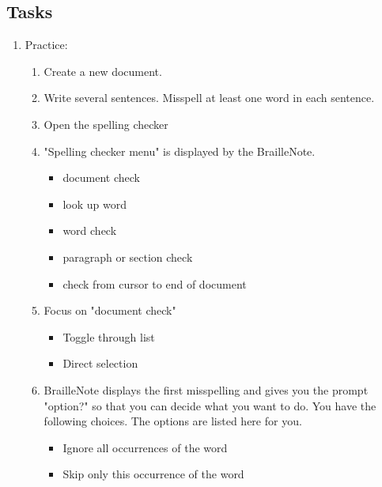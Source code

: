 \documentclass[10pt,letterpaper,twoside]{report}
\begin{document}
\subsection{Tasks}
\begin{enumerate}
	\item Practice:
	      \begin{enumerate}
		      \item Create a new document.
		      \item Write several sentences. Misspell at least one word in each sentence.
		      \item Open the spelling checker 
		      \item "Spelling checker menu" is displayed by the BrailleNote.
		            \begin{itemize}
			            \item document check
			            \item look up word
			            \item word check
			            \item paragraph or section check
			            \item check from cursor to end of document
		            \end{itemize}
		      \item Focus on "document check"
		            \begin{itemize}
			            \item Toggle through list 
			            \item Direct selection 
		            \end{itemize}
		      \item BrailleNote displays the first misspelling and gives you the prompt "option?" so that you can decide what you want to do. You have the following choices. The options are listed here for you.
		            \begin{itemize}
			            \item Ignore all occurrences of the word 
			            \item Skip only this occurrence of the word 

\end{itemize}
\end{enumerate}
\end{enumerate}
\end{document}
